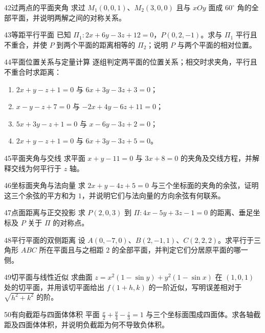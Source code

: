 \begin{exercise}{42}{过两点的平面夹角}
求过 $M_1(0,0,1)$、$M_2(3,0,0)$ 且与 $xOy$ 面成 $60^\circ$ 角的全部平面，并说明两解之间的对称关系。
\end{exercise}
\begin{exercise}{43}{等距平行平面}
已知 $\Pi_1:2x+6y-3z+12=0$，$P(0,2,-1)$。求与 $\Pi_1$ 平行且不重合，并使 $P$ 到两个平面的距离相等的 $\Pi_2$；说明 $P$ 与两个平面的相对位置。
\end{exercise}
\begin{exercise}{44}{平面位置关系与定量计算}
逐组判定两平面的位置关系；相交时求夹角，平行且不重合时求距离：
\begin{enumerate}
\item $2x+y-z+1=0$ 与 $6x+3y-3z+3=0$；
\item $x-y-z+7=0$ 与 $-2x+4y-6z+11=0$；
\item $5x+3y-z+1=0$ 与 $x-6y-3z+2=0$；
\item $2x+y-z+1=0$ 与 $6x+3y-3z+5=0$。
\end{enumerate}
\end{exercise}
\begin{exercise}{45}{平面夹角与交线}
求平面 $x+y-11=0$ 与 $3x+8=0$ 的夹角及交线方程，并解释交线为何平行于 $z$ 轴。
\end{exercise}
\begin{exercise}{46}{坐标面夹角与法向量}
求 $2x+y-4z+5=0$ 与三个坐标面的夹角的余弦，证明这三个余弦的平方和为 $1$，并说明它们与法向量的方向余弦有何联系。
\end{exercise}
\begin{exercise}{47}{点面距离与正交投影}
求 $P(2,0,3)$ 到 $\Pi:4x-5y+3z-1=0$ 的距离、垂足坐标及 $P$ 关于 $\Pi$ 的对称点。
\end{exercise}
\begin{exercise}{48}{平行平面的双侧距离}
设 $A(0,-7,0)$、$B(2,-1,1)$、$C(2,2,2)$。求平行于三角形 $ABC$ 所在平面且与之相距 $2$ 的全部平面，并判定它们分居原平面的哪一侧。
\end{exercise}
\begin{exercise}{49}{切平面与线性近似}
求曲面 $z=x^2(1-\sin y)+y^2(1-\sin x)$ 在 $(1,0,1)$ 处的切平面，并用该切平面给出 $f(1+h,k)$ 的一阶近似，写明误差相对于 $\sqrt{h^2+k^2}$ 的阶。
\end{exercise}
\begin{exercise}{50}{有向截距与四面体体积}
平面 $\frac x2+\frac y4-\frac z3=1$ 与三个坐标面围成四面体。求各轴截距及四面体体积，并说明负截距为何不导致负体积。
\end{exercise}
